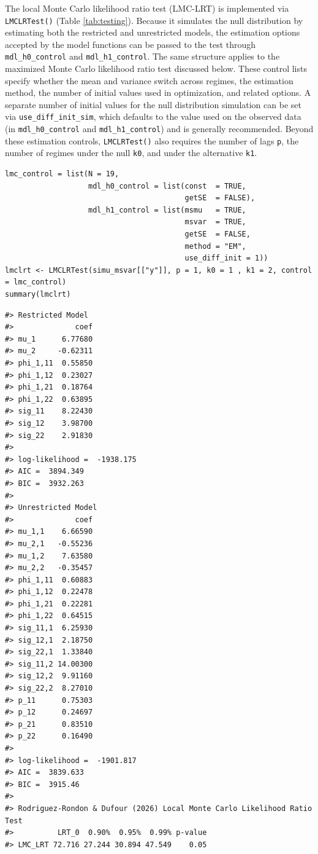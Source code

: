 The local Monte Carlo likelihood ratio test (LMC-LRT) is implemented via \texttt{LMCLRTest()} (Table \ref{tab:testing}). Because it simulates the null distribution by estimating both the restricted and unrestricted models, the estimation options accepted by the model functions can be passed to the test through \texttt{mdl\_h0\_control} and \texttt{mdl\_h1\_control}. The same structure applies to the maximized Monte Carlo likelihood ratio test discussed below. These control lists specify whether the mean and variance switch across regimes, the estimation method, the number of initial values used in optimization, and related options. A separate number of initial values for the null distribution simulation can be set via \texttt{use\_diff\_init\_sim}, which defaults to the value used on the observed data (in \texttt{mdl\_h0\_control} and \texttt{mdl\_h1\_control}) and is generally recommended. Beyond these estimation controls, \texttt{LMCLRTest()} also requires the number of lags \texttt{p}, the number of regimes under the null \texttt{k0}, and under the alternative \texttt{k1}.

\begin{verbatim}
lmc_control = list(N = 19,
                   mdl_h0_control = list(const  = TRUE,
                                         getSE  = FALSE),
                   mdl_h1_control = list(msmu   = TRUE,
                                         msvar  = TRUE,
                                         getSE  = FALSE,
                                         method = "EM",
                                         use_diff_init = 1))
lmclrt <- LMCLRTest(simu_msvar[["y"]], p = 1, k0 = 1 , k1 = 2, control = lmc_control)
summary(lmclrt)
\end{verbatim}

\begin{verbatim}
#> Restricted Model
#>              coef
#> mu_1      6.77680
#> mu_2     -0.62311
#> phi_1,11  0.55850
#> phi_1,12  0.23027
#> phi_1,21  0.18764
#> phi_1,22  0.63895
#> sig_11    8.22430
#> sig_12    3.98700
#> sig_22    2.91830
#> 
#> log-likelihood =  -1938.175
#> AIC =  3894.349
#> BIC =  3932.263
#> 
#> Unrestricted Model
#>              coef
#> mu_1,1    6.66590
#> mu_2,1   -0.55236
#> mu_1,2    7.63580
#> mu_2,2   -0.35457
#> phi_1,11  0.60883
#> phi_1,12  0.22478
#> phi_1,21  0.22281
#> phi_1,22  0.64515
#> sig_11,1  6.25930
#> sig_12,1  2.18750
#> sig_22,1  1.33840
#> sig_11,2 14.00300
#> sig_12,2  9.91160
#> sig_22,2  8.27010
#> p_11      0.75303
#> p_12      0.24697
#> p_21      0.83510
#> p_22      0.16490
#> 
#> log-likelihood =  -1901.817
#> AIC =  3839.633
#> BIC =  3915.46
#> 
#> Rodriguez-Rondon & Dufour (2026) Local Monte Carlo Likelihood Ratio Test
#>          LRT_0  0.90%  0.95%  0.99% p-value
#> LMC_LRT 72.716 27.244 30.894 47.549    0.05
\end{verbatim}

